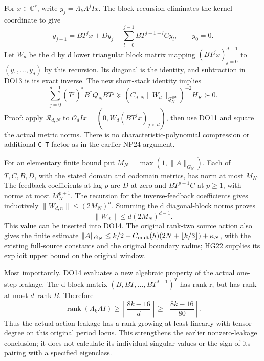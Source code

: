 \documentclass[11pt]{article}
\begin{document}
For \(x\in\mathbb C^r\), write \(y_j=\Lambda_k A^jIx\). The block recursion eliminates the kernel coordinate to give \[
y_{j+1}=BT^jx+Dy_j+
\sum_{l=0}^{j-1}BT^{j-1-l}Cy_l,\qquad y_0=0.
\tag{DO13}
\] Let \(W_d\) be the d by d lower triangular block matrix mapping \((BT^jx)_{j=0}^{d-1}\) to \((y_1,\ldots,y_d)\) by this recursion. Its diagonal is the identity, and subtraction in DO13 is its exact inverse. The new short-stack identity implies \[
\boxed{\displaystyle
\sum_{j=0}^{d-1}(T^j)^*B^*Q_NBT^j
\succeq (C_{d,N}\|W_d\|_{Q_N^{\oplus d}})^{-2}H_K\succ0.}
\tag{DO14}
\] Proof: apply \(\mathcal R_{d,N}\) to \(\mathcal O_dIx=(0,W_d(BT^jx)_{j<d})\), then use DO11 and square the actual metric norms. There is no characteristic-polynomial compression or additional \texttt{C\_T} factor as in the earlier NP24 argument.

For an elementary finite bound put \(M_N=\max(1,\|A\|_{G_N})\). Each of \(T,C,B,D\), with the stated domain and codomain metrics, has norm at most \(M_N\). The feedback coefficients at lag \(p\) are \(D\) at zero and \(BT^{p-1}C\) at \(p\ge1\), with norms at most \(M_N^{p+1}\). The recursion for the inverse-feedback coefficients gives inductively \(\|W_{d,n}\|\le(2M_N)^n\). Summing the d diagonal-block norms proves \[
\|W_d\|\le d(2M_N)^{d-1}.
\tag{DO15}
\] This value can be inserted into DO14. The original rank-two source action also gives the finite estimate \(\|A\|_{G_N}\le k/2+C_{\rm mult}(h)(2N+\lfloor k/3\rfloor)+\kappa_N\), with the existing full-source constants and the original boundary radius; HG22 supplies its explicit upper bound on the original window.

Most importantly, DO14 evaluates a new algebraic property of the actual one-step leakage. The d-block matrix \((B,BT,\ldots,BT^{d-1})^T\) has rank r, but has rank at most \(d\,\operatorname{rank}B\). Therefore \[
\boxed{\displaystyle
\operatorname{rank}(\Lambda_k AI)
\ge\left\lceil\frac{8k-16}{d}\right\rceil
\ge\left\lceil\frac{8k-16}{80}\right\rceil.}
\tag{DO16}
\] Thus the actual action leakage has a rank growing at least linearly with tensor degree on this original period locus. This strengthens the earlier nonzero-leakage conclusion; it does not calculate its individual singular values or the sign of its pairing with a specified eigenclass.
\end{document}
